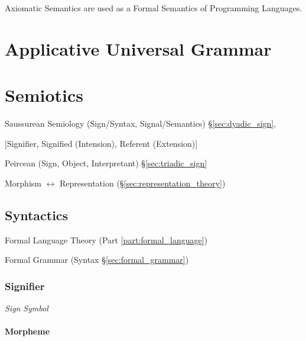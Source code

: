 Axiomatic Semantics are used as a Formal Semantics of Programming
Languages.



\section{Applicative Universal Grammar}
\label{sec:applicative_universal_grammar}

\section{Semiotics}\label{sec:semiotics}

Saussurean Semiology (Sign/Syntax, Signal/Semantics)
\S\ref{sec:dyadic_sign},

[Signifier, Signified (Intension), Referent (Extension)]

Peircean (Sign, Object, Interpretant) \S\ref{sec:triadic_sign}

Morphism $\leftrightarrow$ Representation
(\S\ref{sec:representation_theory})



\subsection{Syntactics}\label{sec:syntactics}

Formal Language Theory (Part \ref{part:formal_language})

Formal Grammar (Syntax \S\ref{sec:formal_grammar})



\subsubsection{Signifier}\label{sec:signifier}

\emph{Sign} \emph{Symbol}



\paragraph{Morpheme}\label{sec:morpheme}\hfill

